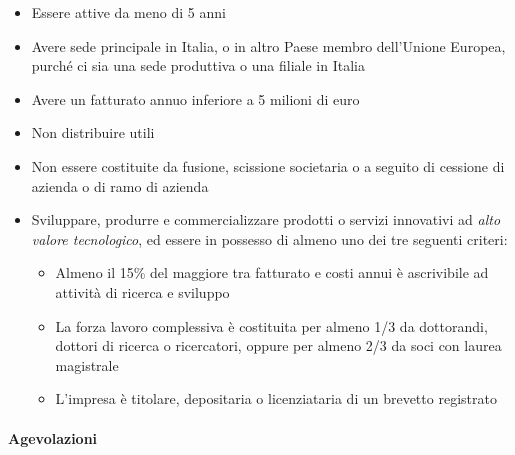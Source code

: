 \begin{itemize}
    \item  Essere attive da meno di 5 anni
    \item Avere sede principale in Italia, o in altro Paese membro dell’Unione Europea, purché ci sia una
    sede produttiva o una filiale in Italia
    \item Avere un fatturato annuo inferiore a 5 milioni di euro
    \item Non distribuire utili
    \item Non essere costituite da fusione, scissione societaria o a seguito di cessione di azienda o di ramo
    di azienda
    \item Sviluppare, produrre e commercializzare prodotti o servizi innovativi ad \emph{alto valore tecnologico},
    ed essere in possesso di almeno uno dei tre seguenti criteri:
    \begin{itemize}
        \item Almeno il 15\% del maggiore tra fatturato e costi annui è ascrivibile ad attività di ricerca e
        sviluppo
        \item La forza lavoro complessiva è costituita per almeno 1/3 da dottorandi, dottori di ricerca o
        ricercatori, oppure per almeno 2/3 da soci con laurea magistrale
        \item L’impresa è titolare, depositaria o licenziataria di un brevetto registrato
    \end{itemize}
\end{itemize}

\paragraph{Agevolazioni}

